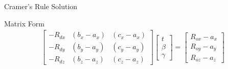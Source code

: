 \begin{frame}{Cramer's Rule Solution}
    \begin{mathbox}{Matrix Form}
        \begin{align}
            \begin{bmatrix}
                -R_{dx} & (b_x-a_x) & (c_x-a_x) \\
                -R_{dy} & (b_y-a_y) & (c_y-a_y) \\
                -R_{dz} & (b_z-a_z) & (c_z-a_z)
            \end{bmatrix}
            \begin{bmatrix}
                t \\ \beta \\ \gamma
            \end{bmatrix}
            =
            \begin{bmatrix}
                R_{ox} - a_x \\
                R_{oy} - a_y \\
                R_{oz} - a_z
            \end{bmatrix}
        \end{align}
    \end{mathbox}
    

\end{frame}
